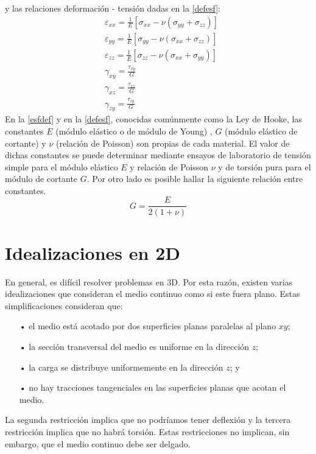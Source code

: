 \documentclass[../notas medios.tex]{subfiles}
\begin{document}
y  las relaciones deformación - tensión dadas en la \cref{defesf}: 
\begin{equation} \label{defesf}
\begin{split}
& {\varepsilon _{xx}} = \frac{1}{E}\left[ {{\sigma _{xx}} - \nu ({\sigma _{yy}} + {\sigma _{zz}})} \right] \\
& {\varepsilon _{yy}} = \frac{1}{E}\left[ {{\sigma _{yy}} - \nu ({\sigma _{xx}} + {\sigma _{zz}})} \right] \\
& {\varepsilon _{zz}} = \frac{1}{E}\left[ {{\sigma _{zz}} - \nu ({\sigma _{xx}} + {\sigma _{yy}})} \right] \\
& {\gamma _{xy}} = \frac{{{\tau _{xy}}}}{G} \\
& {\gamma _{xz}} = \frac{{{\tau _{xz}}}}{G} \\
& {\gamma _{zy}} = \frac{{{\tau _{zy}}}}{G}
\end{split}
\end{equation}
%
En la \cref{esfdef} y en la \cref{defesf}, conocidas comúnmente como la Ley de Hooke, las constantes $E$ (módulo elástico o de módulo de Young) , $G$ (módulo elástico de cortante) y $\nu$ (relación de Poisson) son propias de cada material. El valor de dichas constantes se puede determinar mediante ensayos de laboratorio de tensión simple para el módulo elástico $E$ y relación de Poisson $\nu$ y de torsión pura para el módulo de cortante $G$. Por otro lado es posible hallar la siguiente relación entre constantes.  
\[G = \dfrac{E}{2(1 + \nu)}\]


\section{Idealizaciones en 2D}

En general, es difícil resolver problemas en 3D. Por esta razón, existen varias idealizaciones que consideran el medio continuo como si este fuera plano. Estas simplificaciones consideran que:
\begin{itemize}
\item[•] el medio está acotado por dos superficies planas paralelas al plano \(xy\);
\item[•] la sección transversal del medio es uniforme en la dirección \(z\);
\item[•] la carga se distribuye uniformemente en la dirección \(z\); y
\item[•] no hay tracciones tangenciales en las superficies planas que acotan el medio.
\end{itemize}
La segunda restricción implica que no podríamos tener deflexión y la tercera restricción implica que no habrá torsión. Estas restricciones no implican, sin embargo, que el medio continuo debe ser delgado. 
\end{document}
